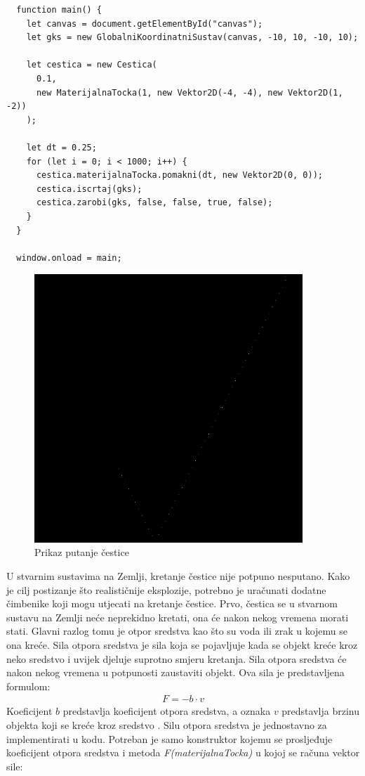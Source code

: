 \documentclass{foi}
\begin{document}
\begin{verbatim}
  function main() {
    let canvas = document.getElementById("canvas");
    let gks = new GlobalniKoordinatniSustav(canvas, -10, 10, -10, 10);

    let cestica = new Cestica(
      0.1,
      new MaterijalnaTocka(1, new Vektor2D(-4, -4), new Vektor2D(1, -2))
    );

    let dt = 0.25;
    for (let i = 0; i < 1000; i++) {
      cestica.materijalnaTocka.pomakni(dt, new Vektor2D(0, 0));
      cestica.iscrtaj(gks);
      cestica.zarobi(gks, false, false, true, false);
    }
  }
  
  window.onload = main;
\end{verbatim}
\begin{figure}[H]
    \centering
    \includegraphics[width=0.9\textwidth]{slike/10_PutanjaCestice.png}
    \captionsetup{justification=centering}
    \caption{Prikaz putanje čestice}
\label{fig:PutanjaCestice}
\end{figure}

U stvarnim sustavima na Zemlji, kretanje čestice nije potpuno nesputano. Kako je cilj postizanje što realističnije eksplozije, potrebno je uračunati dodatne čimbenike koji mogu utjecati na kretanje čestice. Prvo, čestica se u stvarnom sustavu na Zemlji neće neprekidno kretati, ona će nakon nekog vremena morati stati. Glavni razlog tomu je otpor sredstva kao što su voda ili zrak u kojemu se ona kreće. Sila otpora sredstva je sila koja se pojavljuje kada se objekt kreće kroz neko sredstvo i uvijek djeluje suprotno smjeru kretanja. Sila otpora sredstva će nakon nekog vremena u potpunosti zaustaviti objekt. Ova sila je predstavljena formulom:
 \begin{align*}
F = -b\cdot v
\end{align*}
Koeficijent $b$ predstavlja koeficijent otpora sredstva, a oznaka $v$ predstavlja brzinu objekta koji se kreće kroz sredstvo \parencite{UTKLabPhys135}. Silu otpora sredstva je jednostavno za implementirati u kodu. Potreban je samo konstruktor kojemu se prosljeđuje koeficijent otpora sredstva i metoda \textit{F(materijalnaTocka)} u kojoj se računa vektor sile:
\end{document}
